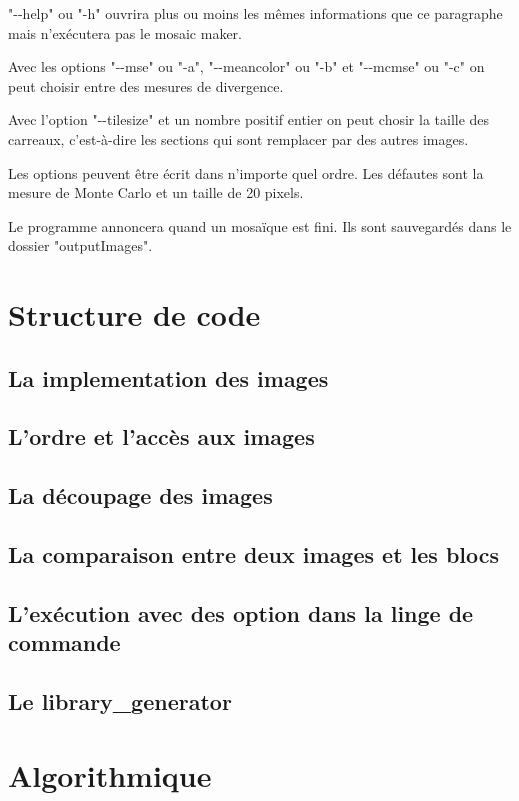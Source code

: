 \documentclass[a4paper]{article}
\begin{document}
"{-}{-}help" ou "-h" ouvrira plus ou moins les m\^emes informations que ce paragraphe mais n'ex\'ecutera pas le mosaic maker.

Avec les options "{-}{-}mse" ou "-a", "{-}{-}meancolor" ou "-b" et "{-}{-}mcmse" ou "-c" on peut choisir entre des mesures de divergence.

Avec l'option "{-}{-}tilesize" et un nombre positif entier on peut chosir la taille des carreaux, c'est-\`a-dire les sections qui sont remplacer par des autres images.

Les options peuvent \^etre \'ecrit dans n'importe quel ordre.
Les d\'efautes sont la mesure de Monte Carlo et un taille de 20 pixels.

Le programme annoncera quand un mosa\"ique est fini.
 Ils sont sauvegard\'es dans le dossier "outputImages". 
\section{Structure de code}
\subsection{La implementation des images}

\subsection{L'ordre et l'acc\`es aux images}

\subsection{La d\'ecoupage des images}

\subsection{La comparaison entre deux images et les blocs}

\subsection{L'ex\'ecution avec des option dans la linge de commande}

\subsection{Le library\_generator}

\section{Algorithmique}
\end{document}

